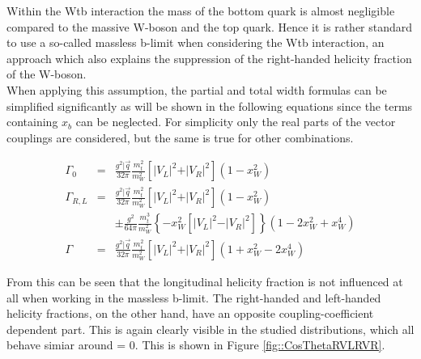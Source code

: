 Within the Wtb interaction the mass of the bottom quark is almost negligible compared to the massive W-boson and the top quark. Hence it is rather standard to use a so-called massless b-limit when considering the Wtb interaction, an approach which also explains the suppression of the right-handed helicity fraction of the W-boson.\\
When applying this assumption, the partial and total width formulas can be simplified significantly as will be shown in the following equations since the terms containing $x_{b}$ can be neglected. For simplicity only the real parts of the vector couplings are considered, but the same is true for other combinations.

\begin{eqnarray}
 \Gamma_{0}   & = & \frac{g^{2} \vert \vec{q}}{32 \pi} \frac{m_{t}^{2}}{m_{W}^{2}} \left[ \vert V_{L} \vert^{2} + \vert V_{R} \vert^{2} \right] (1 - x_{W}^{2} ) \\
 \Gamma_{R,L} & = & \frac{g^{2} \vert \vec{q}}{32 \pi} \frac{m_{t}^{2}}{m_{W}^{2}} \left[ \vert V_{L} \vert^{2} + \vert V_{R} \vert^{2} \right] (1 - x_{W}^{2})  \nonumber \\
              &   & \pm \frac{g^{2}}{64 \pi} \frac{m_{t}^{3}}{m_{W}^{2}} \left\lbrace -x_{W}^{2} \left[ \vert V_{L} \vert^{2} - \vert V_{R} \vert^{2}  \right] \right\rbrace (1-2x_{W}^{2} + x_{W}^{4})\\
 \Gamma       & = & \frac{g^{2} \vert \vec{q}}{32 \pi} \frac{m_{t}^{2}}{m_{W}^{2}} \left[ \vert V_{L} \vert^{2} + \vert V_{R} \vert^{2} \right] (1 + x_{W}^{2} - 2 x_{W}^{4})
\end{eqnarray}

From this can be seen that the longitudinal helicity fraction is not influenced at all when working in the massless b-limit. The right-handed and left-handed helicity fractions, on the other hand, have an opposite coupling-coefficient dependent part. This is again clearly visible in the studied \csTh distributions, which all behave simiar around \csTh = $0$. This is shown in Figure \ref{fig::CosThetaRVLRVR}.

